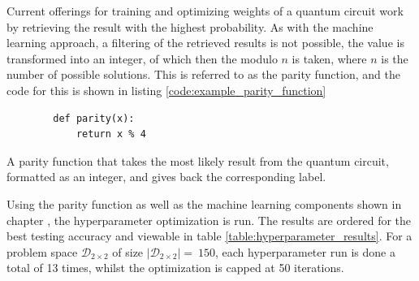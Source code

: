Current offerings for training and optimizing weights of a quantum circuit work by retrieving the result with the highest probability. As with the machine learning approach, a filtering of the retrieved results is not possible, the value is transformed into an integer, of which then the modulo $n$ is taken, where $n$ is the number of possible solutions. This is referred to as the parity function, and the code for this is shown in listing \ref{code:example_parity_function}

\begin{listing}[!h]
    \centering
    \begin{verbatim}
        def parity(x):
            return x % 4
    \end{verbatim}
    \caption{A parity function that takes the most likely result from the quantum circuit, formatted as an integer, and gives back the corresponding label.}
    \label{code:example_parity_function}
\end{listing}

Using the parity function as well as the machine learning components shown in chapter , the hyperparameter optimization is run. The results are ordered for the best testing accuracy and viewable in table \ref{table:hyperparameter_results}. For a problem space $\mathcal{D}_{2\times2}$ of size $\left|\mathcal{D}_{2\times2}\right| =\ 150$, each hyperparameter run is done a total of 13 times, whilst the optimization is capped at 50 iterations.

